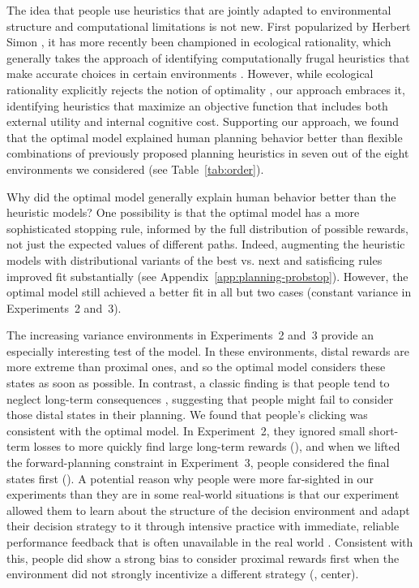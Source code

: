 The idea that people use heuristics that are jointly adapted to environmental structure and computational limitations is not new. First popularized by Herbert Simon \citep{simon1955behavioral}, it has more recently been championed in ecological rationality, which generally takes the approach of identifying computationally frugal heuristics that make accurate choices in certain environments \citep{gigerenzer2008why,gigerenzer2011heuristic,todd2003bounding,gigerenzer1996reasoning}. However, while ecological rationality explicitly rejects the notion of optimality \citep{gigerenzer1999simple}, our approach embraces it, identifying heuristics that maximize an objective function that includes both external utility and internal cognitive cost. Supporting our approach, we found that the optimal model explained human planning behavior better than flexible combinations of previously proposed planning heuristics in seven out of the eight environments we considered (see Table~\ref{tab:order}).

Why did the optimal model generally explain human behavior better than the heuristic models? One possibility is that the optimal model has a more sophisticated stopping rule, informed by the full distribution of possible rewards, not just the expected values of different paths. Indeed, augmenting the heuristic models with distributional variants of the best vs. next and satisficing rules improved fit substantially (see Appendix~\ref{app:planning-probstop}). However, the optimal model still achieved a better fit in all but two cases (constant variance in Experiments~2 and~3).

The increasing variance environments in Experiments~2 and~3 provide an especially interesting test of the model. In these environments, distal rewards are more extreme than proximal ones, and so the optimal model considers these states as soon as possible. In contrast, a classic finding is that people tend to neglect long-term consequences \citep{odonoghue1999doing}, suggesting that people might fail to consider those distal states in their planning. We found that people's clicking was consistent with the optimal model. In Experiment~2, they ignored small short-term losses to more quickly find large long-term rewards (), and when we lifted the forward-planning constraint in Experiment~3, people considered the final states first (). A potential reason why people were more far-sighted in our experiments than they are in some real-world situations is that our experiment allowed them to learn about the structure of the decision environment and adapt their decision strategy to it through intensive practice with immediate, reliable performance feedback that is often unavailable in the real world \citep{kahneman2009conditions}. Consistent with this, people did show a strong bias to consider proximal rewards first when the environment did not strongly incentivize a different strategy (, center).

